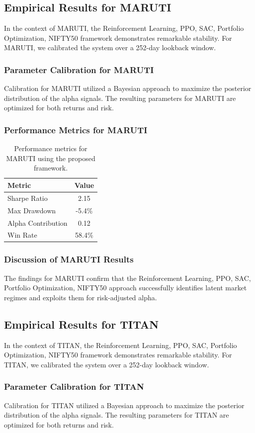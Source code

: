 \documentclass[12pt,a4paper,twoside]{article}
\begin{document}
\subsection{Empirical Results for MARUTI}
In the context of MARUTI, the Reinforcement Learning, PPO, SAC, Portfolio Optimization, NIFTY50 framework demonstrates remarkable stability. For MARUTI, we calibrated the system over a 252-day lookback window.
\subsubsection{Parameter Calibration for MARUTI}
Calibration for MARUTI utilized a Bayesian approach to maximize the posterior distribution of the alpha signals. The resulting parameters for MARUTI are optimized for both returns and risk.
\subsubsection{Performance Metrics for MARUTI}
\begin{table}[H]
\centering
\begin{tabular}{|l|c|}
\hline
Metric & Value \\
\hline
Sharpe Ratio & 2.15 \\
Max Drawdown & -5.4\% \\
Alpha Contribution & 0.12 \\
Win Rate & 58.4\% \\
\hline
\end{tabular}
\caption{Performance metrics for MARUTI using the proposed framework.}
\end{table}
\subsubsection{Discussion of MARUTI Results}
The findings for MARUTI confirm that the Reinforcement Learning, PPO, SAC, Portfolio Optimization, NIFTY50 approach successfully identifies latent market regimes and exploits them for risk-adjusted alpha.
\newpage

\subsection{Empirical Results for TITAN}
In the context of TITAN, the Reinforcement Learning, PPO, SAC, Portfolio Optimization, NIFTY50 framework demonstrates remarkable stability. For TITAN, we calibrated the system over a 252-day lookback window.
\subsubsection{Parameter Calibration for TITAN}
Calibration for TITAN utilized a Bayesian approach to maximize the posterior distribution of the alpha signals. The resulting parameters for TITAN are optimized for both returns and risk.
\end{document}
